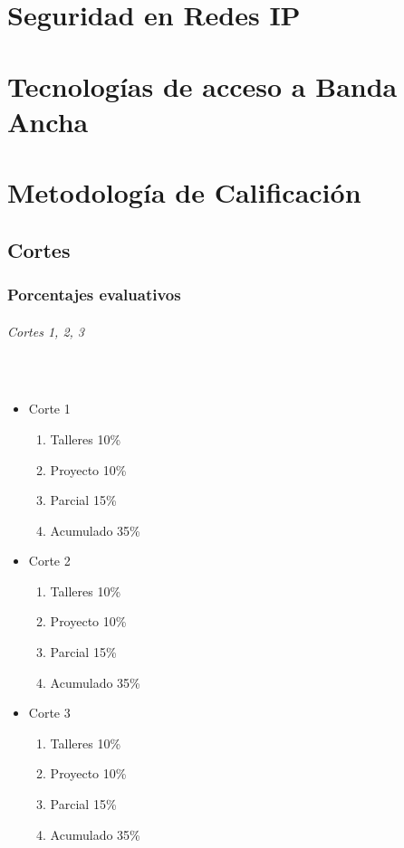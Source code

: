 \documentclass[a4paper]{report} %
\begin{document}
    \part{Seguridad en Redes IP}
    \part{Tecnologías de acceso a Banda Ancha}
    \part{Metodología de Calificación}
      \chapter{Cortes}
        \section{Porcentajes evaluativos}
          \paragraph{Cortes 1, 2, 3}\mbox{}\\
            \begin{itemize}
              \item Corte 1
              \begin{enumerate}
                \item Talleres 10\%
                \item Proyecto 10\%
                \item Parcial 15\%
                \item Acumulado 35\%
              \end{enumerate}
              \item Corte 2
              \begin{enumerate}
                 \item Talleres 10\%
                \item Proyecto 10\%
                \item Parcial 15\%
                \item Acumulado 35\%
              \end{enumerate}
              \item Corte 3
              \begin{enumerate}
                \item Talleres 10\%
                \item Proyecto 10\%
                \item Parcial 15\%
                \item Acumulado 35\%
              \end{enumerate}
            \end{itemize}
\end{document}

